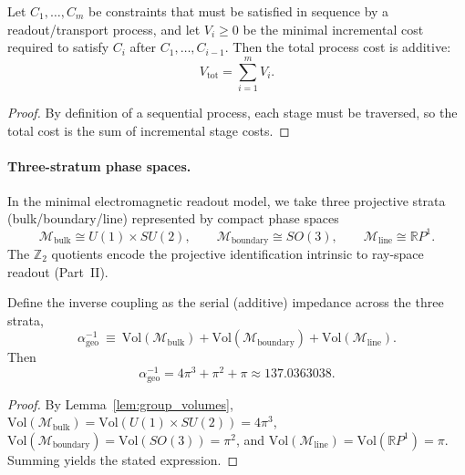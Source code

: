 \begin{lemma}
\label{lemma:series_impedance_additivity}
Let $C_1,\dots,C_m$ be constraints that must be satisfied in sequence by a readout/transport process, and let $V_i\ge 0$ be the minimal incremental cost required to satisfy $C_i$ after $C_1,\dots,C_{i-1}$. Then the total process cost is additive:
\begin{equation}
    V_{\mathrm{tot}}=\sum_{i=1}^{m} V_i.
\end{equation}
\end{lemma}
\begin{proof}
By definition of a sequential process, each stage must be traversed, so the total cost is the sum of incremental stage costs.
\end{proof}

\paragraph{Three-stratum phase spaces.}
In the minimal electromagnetic readout model, we take three projective strata (bulk/boundary/line) represented by compact phase spaces
\begin{equation}
    \mathcal{M}_{\mathrm{bulk}} \cong U(1)\times SU(2),\qquad
    \mathcal{M}_{\mathrm{boundary}} \cong SO(3),\qquad
    \mathcal{M}_{\mathrm{line}} \cong \mathbb{R}P^1.
\end{equation}
The $\mathbb{Z}_2$ quotients encode the projective identification intrinsic to ray-space readout (Part~II).

\begin{theorem}
\label{thm:alpha_three_channel}
Define the inverse coupling as the serial (additive) impedance across the three strata,
\begin{equation}
    \alpha^{-1}_{\mathrm{geo}}\ \equiv\ \mathrm{Vol}(\mathcal{M}_{\mathrm{bulk}})+\mathrm{Vol}(\mathcal{M}_{\mathrm{boundary}})+\mathrm{Vol}(\mathcal{M}_{\mathrm{line}}).
\end{equation}
Then
\begin{equation}
    \alpha^{-1}_{\mathrm{geo}} = 4\pi^3+\pi^2+\pi \approx 137.0363038.
\end{equation}
\end{theorem}
\begin{proof}
By Lemma~\ref{lem:group_volumes},
$\mathrm{Vol}(\mathcal{M}_{\mathrm{bulk}})=\mathrm{Vol}(U(1)\times SU(2))=4\pi^3$,
$\mathrm{Vol}(\mathcal{M}_{\mathrm{boundary}})=\mathrm{Vol}(SO(3))=\pi^2$,
and $\mathrm{Vol}(\mathcal{M}_{\mathrm{line}})=\mathrm{Vol}(\mathbb{R}P^1)=\pi$.
Summing yields the stated expression.
\end{proof}

